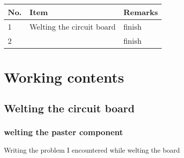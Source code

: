 \documentclass[12pt,a4paper]{article}%
\begin{document}
\vspace{-1em}
\renewcommand\arraystretch{1.5}
\begin{table}[h]\normalsize

\begin{center}

\begin{tabular*}{\linewidth}{|p{1cm}<{\centering}|p{8.3cm}<{\centering}|p{5.3cm}<{\centering}|}  %

\hline  
No. & Item & Remarks \\ \hline  
1   & Welting the circuit board     & finish \\ \hline  
2   &                               & finish \\ \hline
\end{tabular*}  


\end{center}

\end{table}

\vspace{-2em}


\section{Working contents}


\subsection{Welting the circuit board}


\subsubsection{welting the paster component}
Writing the problem I encountered while welting the board
\end{document}
